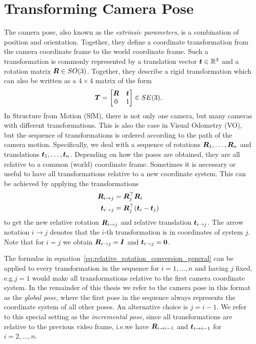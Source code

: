 	\section{Transforming Camera Pose}
		The camera pose, also known as the \emph{extrinsic parameters}, is a combination of position and orientation.
		Together, they define a coordinate transformation from the camera coordinate frame to the world coordinate frame.
		Such a transformation is commonly represented by a translation vector $\bm{t} \in \mathbb{R}^3$ and a rotation matrix $\bm{R} \in SO(3)$. 
		Together, they describe a rigid transformation which can also be written as a $4 \times 4$ matrix of the form
		\begin{equation}\label{eq:pose_representation_se3}
			\bm{T} = 
			\begin{bmatrix}
				\bm{R} 	& \bm{t} \\
				0 			& 1
			\end{bmatrix} 
			\in SE(3).
		\end{equation}
		In Structure from Motion (SfM), there is not only one camera, but many cameras with different transformations.
		This is also the case in Visual Odometry (VO), but the sequence of transformations is ordered according to the path of the camera motion. 
		Specifically, we deal with a sequence of rotations $\bm{R}_1, \dots, \bm{R}_n$ and translations $\bm{t}_1, \dots, \bm{t}_n$. 
		Depending on how the poses are obtained, they are all relative to a common (world) coordinate frame.
		Sometimes it is necessary or useful to have all transformations relative to a new coordinate system.
		This can be achieved by applying the transformations
		\begin{align}\label{eq:relative_rotation_conversion_general}
			\begin{split}
				\bm{R}_{i \rightarrow j} 		&= \bm{R}_{j}^{\top} \bm{R}_{i} \\
				\bm{t}_{i \rightarrow j} 	&= \bm{R}_{j}^{\top} (\bm{t}_i - \bm{t}_j)
			\end{split}
		\end{align}
		to get the new relative rotation 
		$\bm{R}_{i \rightarrow j}$ and relative translation $\bm{t}_{i \rightarrow j}$.
		The arrow notation $i \rightarrow j$ denotes that the $i$-th transformation is in coordinates of system $j$.
		Note that for $i = j$ we obtain 
		$\bm{R}_{i \rightarrow j} = \bm{I}$ 
		and 
		$\bm{t}_{i \rightarrow j} = \bm{0}$.
		
		The formulas in equation~\ref{eq:relative_rotation_conversion_general} can be applied to every transformation in the sequence for $i = 1, \dots, n$ and having $j$ fixed, e.g.\@ $j = 1$ would make all transformations relative to the first camera coordinate system.
		In the remainder of this thesis we refer to the camera pose in this format as the \emph{global pose}, where the first pose in the sequence always represents the coordinate system of all other poses.
		An alternative choice is $j = i - 1$.
		We refer to this special setting as the \emph{incremental pose}, since all transformations are relative to the previous video frame, i.e.\@ we have 
		$\bm{R}_{i \rightarrow i - 1}$ and $\bm{t}_{i \rightarrow i - 1}$
		for $i = 2, \dots, n$.
		

